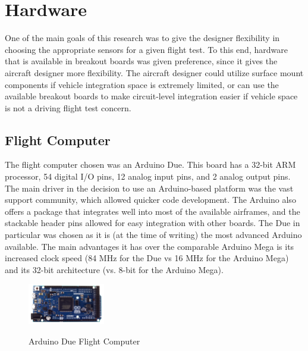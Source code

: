 \section{Hardware}
\label{hardware}
One of the main goals of this research was to give the designer flexibility in choosing the appropriate sensors for a given flight test. To this end, hardware that is available in breakout boards was given preference, since it gives the aircraft designer more flexibility. The aircraft designer could utilize surface mount components if vehicle integration space is extremely limited, or can use the available breakout boards to make circuit-level integration easier if vehicle space is not a driving flight test concern.
\subsection*{Flight Computer}
The flight computer chosen was an Arduino Due. This board has a 32-bit ARM processor, 54 digital I/O pins, 12 analog input pins, and 2 analog output pins. The main driver in the decision to use an Arduino-based platform was the vast support community, which allowed quicker code development. The Arduino also offers a package that integrates well into most of the available airframes, and the stackable header pins allowed for easy integration with other boards. The Due in particular was chosen as it is (at the time of writing) the most advanced Arduino available. The main advantages it has over the comparable Arduino Mega is its increased clock speed (84 MHz for the Due\cite{Atmel2012} vs 16 MHz for the Arduino Mega\cite{Atmel2012atmega}) and its 32-bit architecture (vs. 8-bit for the Arduino Mega).
\begin{figure}[H]

  \centering
    \includegraphics[width=0.3\textwidth]{figures/arduinoDue.jpg}\  \caption{Arduino Due Flight Computer} \label{arduinoPicture}
\end{figure}

